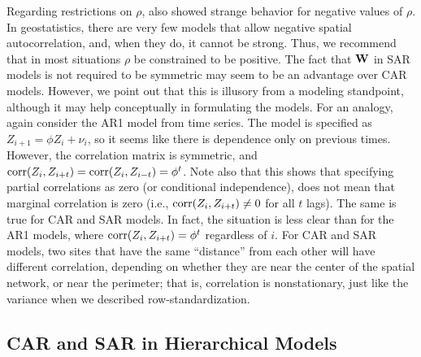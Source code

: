 \documentclass[11pt, titlepage]{article}\usepackage[]{graphicx}\usepackage[]{color}
\begin{document}
\begin{spacing}{1.9}
\begin{flushleft}
Regarding restrictions on $\rho$, \citet{Wall:clos:2004} also showed strange behavior for negative values of $\rho$. In geostatistics, there are very few models that allow negative spatial autocorrelation, and, when they do, it cannot be strong. Thus, we recommend that in most situations $\rho$ be constrained to be positive. The fact that $\mathbf{W}$ in SAR models is not required to be symmetric may seem to be an advantage over CAR models.  However, we point out that this is illusory from a modeling standpoint, although it may help conceptually in formulating the models.  For an analogy, again consider the AR1 model from time series.  The model is specified as $Z_{i+1} = \phi Z_i + \nu_i$, so it seems like there is dependence only on previous times.  However, the correlation matrix is symmetric, and $\textrm{corr}(Z_i, Z_{i + t}) = \textrm{corr}(Z_i,Z_{i - t}) = \phi^t$.  Note also that this shows that specifying partial correlations as zero (or conditional independence), does not mean that marginal correlation is zero (i.e., $\textrm{corr}(Z_i, Z_{i + t}) \neq 0$ for all $t$ lags).  The same is true for CAR and SAR models.  In fact, the situation is less clear than for the AR1 models, where $\textrm{corr}(Z_i, Z_{i + t}) = \phi^t$ regardless of $i$.  For CAR and SAR models, two sites that have the same ``distance'' from each other will have different correlation, depending on whether they are near the center of the spatial network, or near the perimeter; that is, correlation is nonstationary, just like the variance when we described row-standardization.

\subsection*{CAR and SAR in Hierarchical Models}


\end{flushleft}
\end{spacing}
\end{document}
